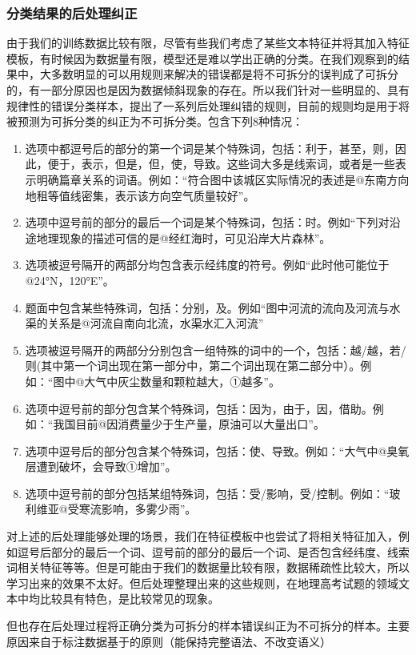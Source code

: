 \documentclass[master, winfont]{njuthesis}
\begin{document}
\subsubsection{分类结果的后处理纠正}
由于我们的训练数据比较有限，尽管有些我们考虑了某些文本特征并将其加入特征模板，有时候因为数据量有限，模型还是难以学出正确的分类。在我们观察到的结果中，大多数明显的可以用规则来解决的错误都是将不可拆分的误判成了可拆分的，有一部分原因也是因为数据倾斜现象的存在。所以我们针对一些明显的、具有规律性的错误分类样本，提出了一系列后处理纠错的规则，目前的规则均是用于将被预测为可拆分类的纠正为不可拆分类。包含下列8种情况：
\begin{enumerate}
	\item 选项中都逗号后的部分的第一个词是某个特殊词，包括：利于，甚至，则，因此，便于，表示，但是，但，使，导致。这些词大多是线索词，或者是一些表示明确篇章关系的词语。例如：“符合图中该城区实际情况的表述是@东南方向地租等值线密集，表示该方向空气质量较好”。
	\item 选项中逗号前的部分的最后一个词是某个特殊词，包括：时。例如“下列对沿途地理现象的描述可信的是@经红海时，可见沿岸大片森林”。
	\item 选项被逗号隔开的两部分均包含表示经纬度的符号。例如“此时他可能位于@24°N，120°E”。
	\item 题面中包含某些特殊词，包括：分别，及。例如“图中河流的流向及河流与水渠的关系是@河流自南向北流，水渠水汇入河流”
	\item 选项被逗号隔开的两部分分别包含一组特殊的词中的一个，包括：越/越，若/则(其中第一个词出现在第一部分中，第二个词出现在第二部分中）。例如：“图中@大气中灰尘数量和颗粒越大，①越多”。
	\item 选项中逗号前的部分包含某个特殊词，包括：因为，由于，因，借助。例如：“我国目前@因消费量少于生产量，原油可以大量出口”。
	\item 选项中逗号后的部分包含某个特殊词，包括：使、导致。例如：“大气中@臭氧层遭到破坏，会导致①增加”。
	\item 选项中逗号前的部分包括某组特殊词，包括：受/影响，受/控制。例如：“玻利维亚@受寒流影响，多雾少雨”。
\end{enumerate}

对上述的后处理能够处理的场景，我们在特征模板中也尝试了将相关特征加入，例如逗号后部分的最后一个词、逗号前的部分的最后一个词、是否包含经纬度、线索词相关特征等等。但是可能由于我们的数据量比较有限，数据稀疏性比较大，所以学习出来的效果不太好。但后处理整理出来的这些规则，在地理高考试题的领域文本中均比较具有特色，是比较常见的现象。

但也存在后处理过程将正确分类为可拆分的样本错误纠正为不可拆分的样本。主要原因来自于标注数据基于的原则（能保持完整语法、不改变语义）
\end{document}
